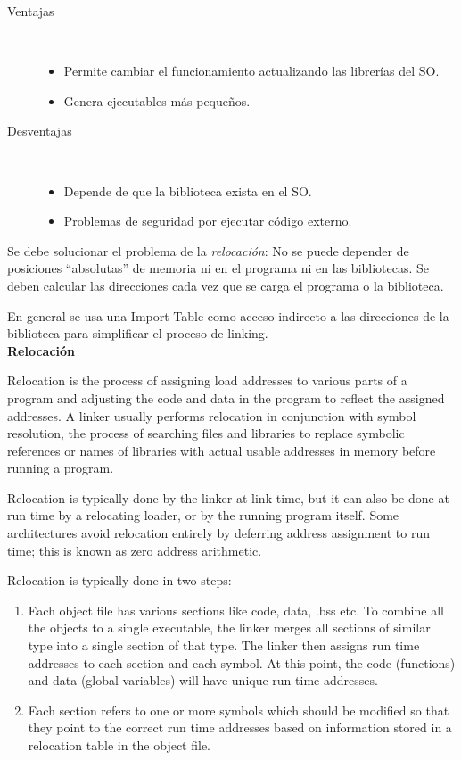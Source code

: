 \documentclass[a4paper, twoside]{article}
\begin{document}
\begin{description}
  \item[Ventajas] ~
  \begin{itemize}
    \item Permite cambiar el funcionamiento actualizando las librerías del SO.
    \item Genera ejecutables más pequeños.
  \end{itemize}

  \item[Desventajas] ~
  \begin{itemize}
    \item Depende de que la biblioteca exista en el SO.
    \item Problemas de seguridad por ejecutar código externo.
  \end{itemize}
\end{description}

Se debe solucionar el problema de la \emph{relocación}: No se puede depender de
posiciones ``absolutas'' de memoria ni en el programa ni en las bibliotecas.
Se deben calcular las direcciones cada vez que se carga el programa o
la biblioteca.

En general se usa una Import Table como acceso indirecto a las direcciones de
la biblioteca para simplificar el proceso de linking.\\

\textbf{Relocación}

Relocation is the process of assigning load addresses to various parts of
a program and adjusting the code and data in the program to reflect the
assigned addresses.
A linker usually performs relocation in conjunction with symbol resolution,
the process of searching files and libraries to replace symbolic references or
names of libraries with actual usable addresses in memory before running
a program.

Relocation is typically done by the linker at link time, but it can also be
done at run time by a relocating loader, or by the running program itself.
Some architectures avoid relocation entirely by deferring address assignment to
run time; this is known as zero address arithmetic.

Relocation is typically done in two steps:
\begin{enumerate}
  \item Each object file has various sections like code, data, .bss etc.
  To combine all the objects to a single executable, the linker merges all
  sections of similar type into a single section of that type.
  The linker then assigns run time addresses to each section and each symbol.
  At this point, the code (functions) and data (global variables) will have
  unique run time addresses.
  \item Each section refers to one or more symbols which should be modified so
  that they point to the correct run time addresses based on information stored
  in a relocation table in the object file.
\end{enumerate}
\end{document}
